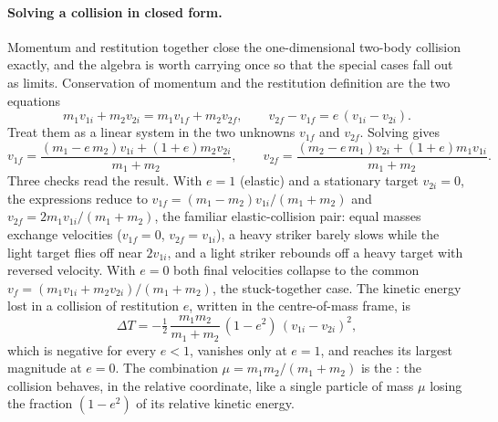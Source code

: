 \paragraph{Solving a collision in closed form.} Momentum and restitution
together close the one-dimensional two-body collision exactly, and the
algebra is worth carrying once so that the special cases fall out as
limits. Conservation of momentum and the restitution definition are the
two equations
\[
m_{1}v_{1i}+m_{2}v_{2i}=m_{1}v_{1f}+m_{2}v_{2f}, \qquad
v_{2f}-v_{1f}=e\,(v_{1i}-v_{2i}).
\]
Treat them as a linear system in the two unknowns $v_{1f}$ and $v_{2f}$.
Solving gives
\[
v_{1f}=\frac{(m_{1}-e\,m_{2})v_{1i}+(1+e)m_{2}v_{2i}}{m_{1}+m_{2}},
\qquad
v_{2f}=\frac{(m_{2}-e\,m_{1})v_{2i}+(1+e)m_{1}v_{1i}}{m_{1}+m_{2}}.
\]
Three checks read the result. With $e=1$ (elastic) and a stationary
target $v_{2i}=0$, the expressions reduce to $v_{1f}=(m_{1}-m_{2})v_{1i}/
(m_{1}+m_{2})$ and $v_{2f}=2m_{1}v_{1i}/(m_{1}+m_{2})$, the familiar
elastic-collision pair: equal masses exchange velocities ($v_{1f}=0$,
$v_{2f}=v_{1i}$), a heavy striker barely slows while the light target
flies off near $2v_{1i}$, and a light striker rebounds off a heavy target
with reversed velocity. With $e=0$ both final velocities collapse to the
common $v_{f}=(m_{1}v_{1i}+m_{2}v_{2i})/(m_{1}+m_{2})$, the stuck-together
case. The kinetic energy lost in a collision of restitution $e$, written
in the centre-of-mass frame, is
\[
\Delta T=-\tfrac{1}{2}\,\frac{m_{1}m_{2}}{m_{1}+m_{2}}\,(1-e^{2})\,(v_{1i}
-v_{2i})^{2},
\]
which is negative for every $e<1$, vanishes only at $e=1$, and reaches
its largest magnitude at $e=0$. The combination $\mu=m_{1}m_{2}/(m_{1}+
m_{2})$ is the : the collision behaves, in the
relative coordinate, like a single particle of mass $\mu$ losing the
fraction $(1-e^{2})$ of its relative kinetic energy.

